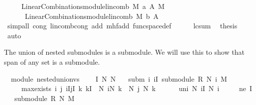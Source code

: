 \begin{isabellebody}
\ \ \ \ {\isacharequal}\ LinearCombinations{\isachardot}module{\isachardot}lincomb\ M\ {\isacharquery}a\ A\ {\isasymominus}\isactrlbsub M\isactrlesub \ \isanewline
\ \ \ \ \ \ LinearCombinations{\isachardot}module{\isachardot}lincomb\ M\ {\isacharquery}b\ A{\isachardoublequoteclose}\ \ \isanewline
\ \ \ \ \isamarkupfalse%
\ {\isacharparenleft}simp{\isacharunderscore}all\ cong{\isacharcolon}\ lincomb{\isacharunderscore}cong\ add{\isacharcolon}\ mh{\isachardot}f{\isacharunderscore}add\ func{\isacharunderscore}space{\isacharunderscore}def{\isacharparenright}\isanewline
\ \ \isamarkupfalse%
\ {}\ {}\ lc{\isacharunderscore}sum\ \isamarkupfalse%
\ {\isacharquery}thesis\ \isamarkupfalse%
\ auto\isanewline
{}\isamarkupfalse%
%
\endisatagproof
{\isafoldproof}%
%
\isadelimproof
%
\endisadelimproof
%
\begin{isamarkuptext}%
The union of nested submodules is a submodule. We will use this to show that span of any
set is a submodule.%
\end{isamarkuptext}%
\isamarkuptrue%
\isamarkupfalse%
\ {\isacharparenleft}\ module{\isacharparenright}\ nested{\isacharunderscore}union{\isacharunderscore}vs{\isacharcolon}\ \isanewline
\ \ \ I\ N\ N{\isacharprime}\isanewline
\ \ \ subm{\isacharcolon}\ {\isachardoublequoteopen}{\isasymAnd}i{\isachardot}\ i{\isasymin}I{\isasymLongrightarrow}\ submodule\ R\ {\isacharparenleft}N\ i{\isacharparenright}\ M{\isachardoublequoteclose}\isanewline
\ \ \ \ \ max{\isacharunderscore}exists{\isacharcolon}\ {\isachardoublequoteopen}{\isasymAnd}i\ j{\isachardot}\ i{\isasymin}I{\isasymLongrightarrow}j{\isasymin}I{\isasymLongrightarrow}\ {\isacharparenleft}{\isasymexists}k{\isachardot}\ k{\isasymin}I\ {\isasymand}\ N\ i{\isasymsubseteq}N\ k\ {\isasymand}\ N\ j\ {\isasymsubseteq}N\ k{\isacharparenright}{\isachardoublequoteclose}\ \isanewline
\ \ \ \ \ uni{\isacharcolon}\ {\isachardoublequoteopen}N{\isacharprime}{\isacharequal}{\isacharparenleft}{\isasymUnion}\ i{\isasymin}I{\isachardot}\ N\ i{\isacharparenright}{\isachardoublequoteclose}\isanewline
\ \ \ \ \ ne{\isacharcolon}\ {\isachardoublequoteopen}I{\isasymnoteq}{\isacharbraceleft}{\isacharbraceright}{\isachardoublequoteclose}\isanewline
\ \ \ {\isachardoublequoteopen}submodule\ R\ N{\isacharprime}\ M{\isachardoublequoteclose}\isanewline
%
\isadelimproof
%
\endisadelimproof
%
\isatagproof

\end{isabellebody}
